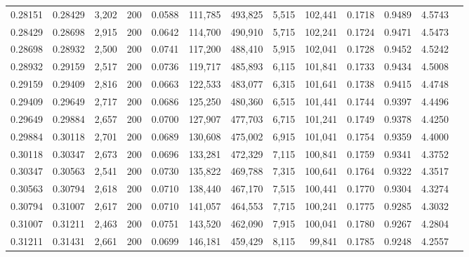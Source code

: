 \begin{tabular}{rrrrrrrrrrrrr}
0.28151 & 0.28429 & 3,202 & 200 &                                     0.0588 & 111,785 & 493,825 &   5,515 & 102,441 & 0.1718 & 0.9489 & 4.5743 \\
0.28429 & 0.28698 & 2,915 & 200 &                                     0.0642 & 114,700 & 490,910 &   5,715 & 102,241 & 0.1724 & 0.9471 & 4.5473 \\
0.28698 & 0.28932 & 2,500 & 200 &                                     0.0741 & 117,200 & 488,410 &   5,915 & 102,041 & 0.1728 & 0.9452 & 4.5242 \\
0.28932 & 0.29159 & 2,517 & 200 &                                     0.0736 & 119,717 & 485,893 &   6,115 & 101,841 & 0.1733 & 0.9434 & 4.5008 \\
0.29159 & 0.29409 & 2,816 & 200 &                                     0.0663 & 122,533 & 483,077 &   6,315 & 101,641 & 0.1738 & 0.9415 & 4.4748 \\
0.29409 & 0.29649 & 2,717 & 200 &                                     0.0686 & 125,250 & 480,360 &   6,515 & 101,441 & 0.1744 & 0.9397 & 4.4496 \\
0.29649 & 0.29884 & 2,657 & 200 &                                     0.0700 & 127,907 & 477,703 &   6,715 & 101,241 & 0.1749 & 0.9378 & 4.4250 \\
0.29884 & 0.30118 & 2,701 & 200 &                                     0.0689 & 130,608 & 475,002 &   6,915 & 101,041 & 0.1754 & 0.9359 & 4.4000 \\
0.30118 & 0.30347 & 2,673 & 200 &                                     0.0696 & 133,281 & 472,329 &   7,115 & 100,841 & 0.1759 & 0.9341 & 4.3752 \\
0.30347 & 0.30563 & 2,541 & 200 &                                     0.0730 & 135,822 & 469,788 &   7,315 & 100,641 & 0.1764 & 0.9322 & 4.3517 \\
0.30563 & 0.30794 & 2,618 & 200 &                                     0.0710 & 138,440 & 467,170 &   7,515 & 100,441 & 0.1770 & 0.9304 & 4.3274 \\
0.30794 & 0.31007 & 2,617 & 200 &                                     0.0710 & 141,057 & 464,553 &   7,715 & 100,241 & 0.1775 & 0.9285 & 4.3032 \\
0.31007 & 0.31211 & 2,463 & 200 &                                     0.0751 & 143,520 & 462,090 &   7,915 & 100,041 & 0.1780 & 0.9267 & 4.2804 \\
0.31211 & 0.31431 & 2,661 & 200 &                                     0.0699 & 146,181 & 459,429 &   8,115 &  99,841 & 0.1785 & 0.9248 & 4.2557 \\

\end{tabular}
